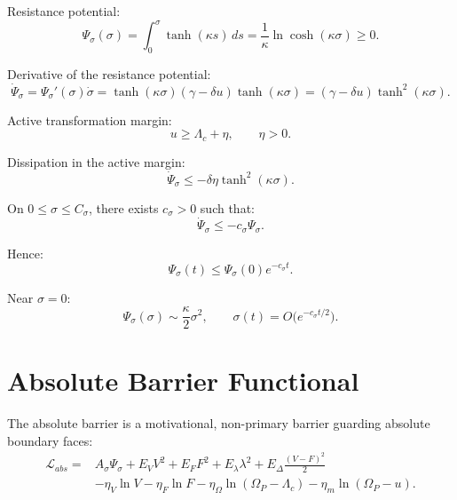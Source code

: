 \documentclass[11pt,a4paper]{article}
\newcommand{\Om}{\Omega_P}
\theoremstyle{plain}
\theoremstyle{definition}
\theoremstyle{remark}
\begin{document}
Resistance potential:
\begin{equation}
  \Psi_\sigma(\sigma)=\int_0^\sigma\tanh(\kappa s)\,ds
  =\frac{1}{\kappa}\ln\cosh(\kappa\sigma)\ge0.
\end{equation}

Derivative of the resistance potential:
\begin{equation}
  \dot\Psi_\sigma
  =\Psi_\sigma'(\sigma)\dot\sigma
  =\tanh(\kappa\sigma)(\gamma-\delta u)\tanh(\kappa\sigma)
  =(\gamma-\delta u)\tanh^2(\kappa\sigma).
\end{equation}

Active transformation margin:
\begin{equation}
  u\ge\Lambda_c+\eta,
  \qquad \eta>0.
\end{equation}

Dissipation in the active margin:
\begin{equation}
  \dot\Psi_\sigma\le -\delta\eta\tanh^2(\kappa\sigma).
\end{equation}

On $0\le\sigma\le C_\sigma$, there exists $c_\sigma>0$ such that:
\begin{equation}
  \dot\Psi_\sigma\le -c_\sigma\Psi_\sigma.
\end{equation}

Hence:
\begin{equation}
  \Psi_\sigma(t)\le \Psi_\sigma(0)e^{-c_\sigma t}.
\end{equation}

Near $\sigma=0$:
\begin{equation}
  \Psi_\sigma(\sigma)\sim \frac{\kappa}{2}\sigma^2,
  \qquad
  \sigma(t)=O\bigl(e^{-c_\sigma t/2}\bigr).
\end{equation}

\section{Absolute Barrier Functional}

The absolute barrier is a motivational, non-primary barrier guarding absolute boundary faces:
\begin{equation}
\begin{aligned}
  \mathcal L_{abs}={}&
  A_\sigma\Psi_\sigma+E_VV^2+E_FF^2+E_\lambda\lambda^2
  +E_\Delta\frac{(V-F)^2}{2} \\
  &-\eta_V\ln V-\eta_F\ln F
  -\eta_\Omega\ln(\Om-\Lambda_c)
  -\eta_m\ln(\Om-u).
\end{aligned}
\end{equation}
\end{document}

